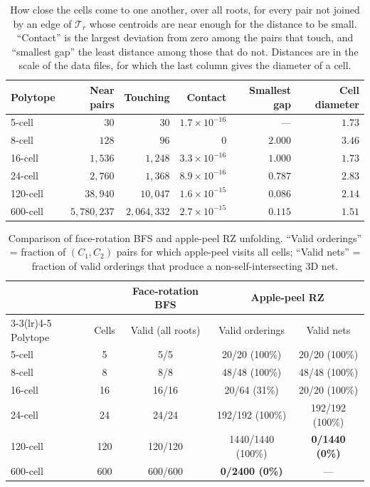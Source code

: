 \documentclass[11pt,letterpaper]{article}
\begin{document}
\begin{table}[ht]
\centering
\caption{How close the cells come to one another, over all roots, for
  every pair not joined by an edge of $\mathcal{T}_r$ whose centroids are
  near enough for the distance to be small.
  ``Contact'' is the largest deviation from zero among the pairs that
  touch, and ``smallest gap'' the least distance among those that do not.
  Distances are in the scale of the data files, for which the last column
  gives the diameter of a cell.}
\label{tab:margin}
\begin{tabular}{lrrrrr}
\toprule
Polytope & Near pairs & Touching & Contact & Smallest gap & Cell diameter\\
\midrule
5-cell   &      $30$ &      $30$ & $1.7\times10^{-16}$ & ---     & $1.73$\\
8-cell   &     $128$ &      $96$ & $0$                 & $2.000$ & $3.46$\\
16-cell  &  $1{,}536$ &  $1{,}248$ & $3.3\times10^{-16}$ & $1.000$ & $1.73$\\
24-cell  &  $2{,}760$ &  $1{,}368$ & $8.9\times10^{-16}$ & $0.787$ & $2.83$\\
120-cell & $38{,}940$ & $10{,}047$ & $1.6\times10^{-15}$ & $0.086$ & $2.14$\\
600-cell & $5{,}780{,}237$ & $2{,}064{,}332$ & $2.7\times10^{-15}$ & $0.115$ & $1.51$\\
\bottomrule
\end{tabular}
\end{table}

\begin{table}[ht]
\centering
\caption{Comparison of face-rotation BFS and apple-peel RZ unfolding.
  ``Valid orderings'' = fraction of $(C_1, C_2)$ pairs for which
  apple-peel visits all cells;
  ``Valid nets'' = fraction of valid orderings that produce a
  non-self-intersecting 3D net.}
\label{tab:contrast}
\begin{tabular}{lcccc}
\toprule
& & \multicolumn{1}{c}{Face-rotation BFS}
  & \multicolumn{2}{c}{Apple-peel RZ \cite{YoshinoChaidee2026}} \\
\cmidrule(lr){3-3}\cmidrule(lr){4-5}
Polytope & Cells & Valid (all roots) & Valid orderings & Valid nets \\
\midrule
5-cell   &    5 &   5/5   & 20/20 (100\%)     & 20/20 (100\%)         \\
8-cell   &    8 &   8/8   & 48/48 (100\%)     & 48/48 (100\%)         \\
16-cell  &   16 &  16/16  & 20/64 (31\%)      & 20/20 (100\%)         \\
24-cell  &   24 &  24/24  & 192/192 (100\%)   & 192/192 (100\%)       \\
120-cell &  120 & 120/120 & 1440/1440 (100\%) & \textbf{0/1440 (0\%)} \\
600-cell &  600 & 600/600 & \textbf{0/2400 (0\%)} & ---               \\
\bottomrule
\end{tabular}
\end{table}
\end{document}
